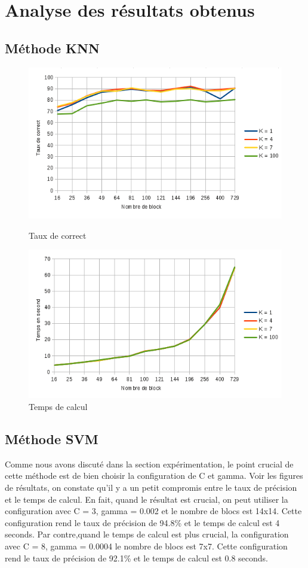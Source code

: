 \documentclass[]{article}   %
\begin{document}
\section{Analyse des résultats obtenus}
\subsection{Méthode KNN}

\begin{figure}[!htb]
  \includegraphics[width=\linewidth]{images/graphique.png}
  \caption{Taux de correct}\label{fig:awesome_image2}
\endminipage\hfill
{}
  \includegraphics[width=\linewidth]{images/graphique1.png}
  \caption{Temps de calcul}\label{fig:awesome_image3}
\endminipage\hfill
\end{figure}

\subsection{Méthode SVM}
Comme nous avons discuté dans la section expérimentation, le point crucial de cette 
méthode est de bien choisir la configuration de C et gamma. Voir les figures de 
résultats, on constate qu'il y a un petit compromis entre le taux de précision et le 
temps de calcul. En fait, quand le résultat est crucial, on peut utiliser la 
configuration avec C = 3, gamma = 0.002 et le nombre de blocs est 14x14. Cette 
configuration rend le taux de précision de 
94.8\% et le temps de calcul est 4 seconds.
Par contre,quand le temps de calcul est plus crucial, la configuration avec C = 8, gamma = 
0.0004 le nombre de blocs est 7x7. Cette configuration rend le taux de précision de 
92.1\% et le temps de calcul est 0.8 seconds. 
\end{document}
